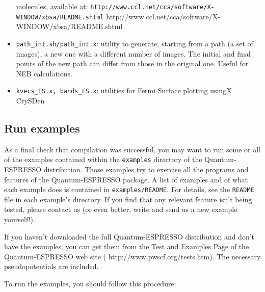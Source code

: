 \documentclass[12pt,a4paper]{article}
\begin{document}
\begin{itemize}
        molecules, available at:\hfill\break
        \htmladdnormallink%
        {\texttt{http://www.ccl.net/cca/software/X-WINDOW/xbsa/README.shtml}}%
        {http://www.ccl.net/cca/software/X-WINDOW/xbsa/README.shtml}
\item \texttt{path\_int.sh/path\_int.x}: utility to generate, starting
        from a path (a set of images), a new one with a different number of
        images. The initial and final points of the new path can differ
        from those in the original one. Useful for NEB calculations.
  \item \texttt{kvecs\_FS.x, bands\_FS.x}: utilities for Fermi Surface
        plotting usingX CrySDen
\end{itemize}

\subsection{Run examples}
  \label{runexamples}

As a final check that compilation was successful, you may want to run
some or all of the examples contained within the \texttt{examples}
directory of the Quantum-ESPRESSO distribution.
Those examples try to exercise all the programs and features of the
Quantum-ESPRESSO package. A list of examples and of what each example
does is contained in \texttt{examples/README}. For details, see the 
\texttt{README} file in each example's directory. 
If you find that any relevant feature isn't being tested, please
contact us (or even better, write and send us a new example
yourself!).

If you haven't downloaded the full Quantum-ESPRESSO distribution and don't
have the examples, you can get them from the Test and Examples Page of
the Quantum-ESPRESSO web site
(%
                   {http://www.pwscf.org/tests.htm}).
The necessary pseudopotentials are included.

To run the examples, you should follow this procedure:
\end{document}
